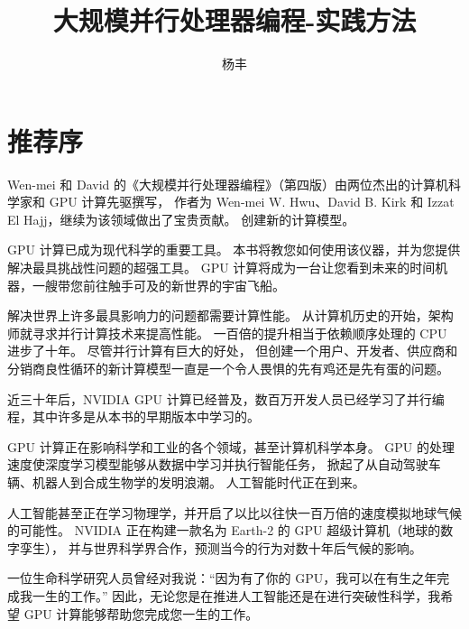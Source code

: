 \documentclass{ctexart}
\numberwithin{equation}{section}
\begin{document}
\title{大规模并行处理器编程-实践方法}

\author{杨丰}
\date{}
\maketitle

\tableofcontents

\newpage
\section*{推荐序}
Wen-mei 和 David 的《大规模并行处理器编程》（第四版）由两位杰出的计算机科学家和 GPU 计算先驱撰写，
作者为 Wen-mei W. Hwu、David B. Kirk 和 Izzat El Hajj，继续为该领域做出了宝贵贡献。 创建新的计算模型。

GPU 计算已成为现代科学的重要工具。 本书将教您如何使用该仪器，并为您提供解决最具挑战性问题的超强工具。 
GPU 计算将成为一台让您看到未来的时间机器，一艘带您前往触手可及的新世界的宇宙飞船。

解决世界上许多最具影响力的问题都需要计算性能。 从计算机历史的开始，架构师就寻求并行计算技术来提高性能。 
一百倍的提升相当于依赖顺序处理的 CPU 进步了十年。 尽管并行计算有巨大的好处，
但创建一个用户、开发者、供应商和分销商良性循环的新计算模型一直是一个令人畏惧的先有鸡还是先有蛋的问题。

近三十年后，NVIDIA GPU 计算已经普及，数百万开发人员已经学习了并行编程，其中许多是从本书的早期版本中学习的。

GPU 计算正在影响科学和工业的各个领域，甚至计算机科学本身。 GPU 的处理速度使深度学习模型能够从数据中学习并执行智能任务，
掀起了从自动驾驶车辆、机器人到合成生物学的发明浪潮。 人工智能时代正在到来。

人工智能甚至正在学习物理学，并开启了以比以往快一百万倍的速度模拟地球气候的可能性。 
NVIDIA 正在构建一款名为 Earth-2 的 GPU 超级计算机（地球的数字孪生），
并与世界科学界合作，预测当今的行为对数十年后气候的影响。

一位生命科学研究人员曾经对我说：“因为有了你的 GPU，我可以在有生之年完成我一生的工作。” 
因此，无论您是在推进人工智能还是在进行突破性科学，我希望 GPU 计算能够帮助您完成您一生的工作。
\\

\newpage


\newpage


\newpage


\newpage


\newpage


\newpage

\end{document}
